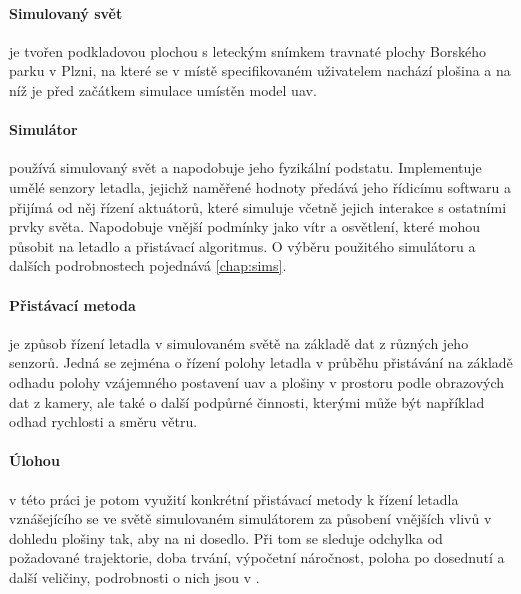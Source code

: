 \paragraph{Simulovaný svět} je tvořen podkladovou plochou s leteckým snímkem travnaté plochy Borského parku v Plzni, na které se v místě specifikovaném uživatelem nachází plošina a na níž je před začátkem simulace umístěn model \acrshort{uav}.

\paragraph{Simulátor} používá simulovaný svět a napodobuje jeho fyzikální podstatu. Implementuje umělé senzory letadla, jejichž naměřené hodnoty předává jeho řídicímu softwaru a přijímá od něj řízení aktuátorů, které simuluje včetně jejich interakce s ostatními prvky světa. Napodobuje vnější podmínky jako vítr a osvětlení, které mohou působit na letadlo a přistávací algoritmus. O výběru použitého simulátoru a dalších podrobnostech pojednává \cref{chap:sims}.

\paragraph{Přistávací metoda} je způsob řízení letadla v simulovaném světě na základě dat z různých jeho senzorů. Jedná se zejména o řízení polohy letadla v průběhu přistávání na základě odhadu polohy vzájemného postavení \acrshort{uav} a plošiny v prostoru podle obrazových dat z kamery, ale také o další podpůrné činnosti, kterými může být například odhad rychlosti a směru větru.

\paragraph{Úlohou} v této práci je potom využití konkrétní přistávací metody k řízení letadla vznášejícího se ve světě simulovaném simulátorem za působení vnějších vlivů v dohledu plošiny tak, aby na ni dosedlo. Při tom se sleduje odchylka od požadované trajektorie, doba trvání, výpočetní náročnost, poloha po dosednutí a další veličiny, podrobnosti o nich jsou v .